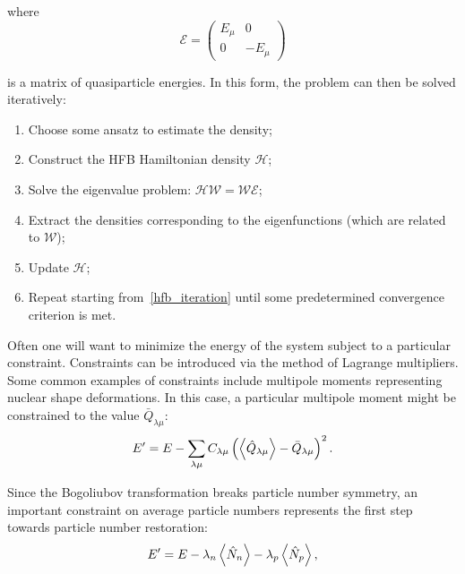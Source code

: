 \noindent where
\begin{equation}
\mathcal{E} = \left(\begin{array}{cc}
E_\mu & 0 \\
0 & -E_\mu
\end{array}\right)
\end{equation}

\noindent is a matrix of quasiparticle energies. In this form, the problem can then be solved iteratively:
\begin{enumerate}
	\setlength\itemsep{-2em}
	\item Choose some ansatz to estimate the density;\\
	\item Construct the HFB Hamiltonian density $\mathcal{H}$;\\
	\item Solve the eigenvalue problem: $\mathcal{H}\mathcal{W} = \mathcal{W}\mathcal{E}$; \label{hfb_iteration}\\
	\item Extract the densities corresponding to the eigenfunctions (which are related to $\mathcal{W}$);\\
	\item Update $\mathcal{H}$; \\
	\item Repeat starting from~\ref{hfb_iteration} until some predetermined convergence criterion is met.
\end{enumerate}


Often one will want to minimize the energy of the system subject to a particular constraint. Constraints can be introduced via the method of Lagrange multipliers. Some common examples of constraints include multipole moments representing nuclear shape deformations. In this case, a particular multipole moment might be constrained to the value $\bar{Q}_{\lambda\mu}$:
\begin{equation}\label{eq:routhian}
E' = E - \sum_{\lambda\mu} C_{\lambda\mu} \left(\expval{\hat{Q}_{\lambda\mu}} - \bar{Q}_{\lambda\mu}\right)^2.
\end{equation}

\noindent Since the Bogoliubov transformation breaks particle number symmetry, an important constraint on average particle numbers represents the first step towards particle number restoration:
\begin{equation}
E' = E - \lambda_n \expval{\hat{N}_n} - \lambda_p \expval{\hat{N}_p},
\end{equation}

